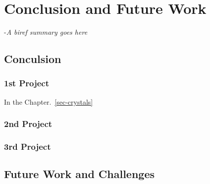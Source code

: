 \chapter{Conclusion and Future Work}
\label{sec-conclusion}
-{\it A biref summary goes here}

\section{Conculsion}



\subsection{1st Project}
In the Chapter.~\ref{sec-crystals}

\subsection{2nd Project}


\subsection{3rd Project}


\section{Future Work and Challenges}


